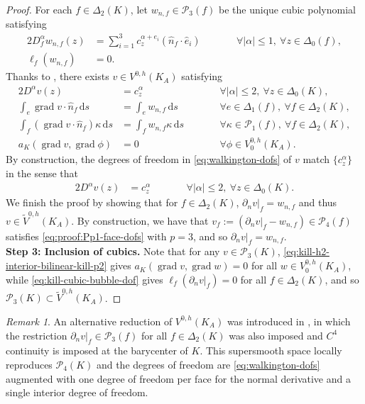 \documentclass{mcom-l}
\theoremstyle{definition}
\theoremstyle{remark}
\newtheorem{remark}[theorem]{Remark}
\numberwithin{equation}{section}
\newcommand{\unitvec}[1]{\hat{#1}}
\renewcommand{\d}[1]{\,\mathrm{d}{#1}}
\DeclareMathOperator{\grad}{grad}
\begin{document}
\begin{proof}
	For each $f \in \Delta_2(K)$, let $w_{n, f} \in \mathcal{P}_3(f)$ be
	the unique cubic polynomial satisfying
	\begin{alignat*}{2}
		D_f^{\alpha} w_{n, f}(z) &= \sum_{i=1}^{3} c_{z}^{\alpha + e_i} 
		(\unitvec{n}_f \cdot \unitvec{e}_i)
		\qquad & &\forall |\alpha| \leq 1, 
		\ \forall z \in \Delta_0(f), \\
		\ell_{f} (w_{n, f}) &= 0. \qquad & & 
	\end{alignat*}
	Thanks to \cite[Lemma 4.8]{FuGuzmanNeilan20}, there exists 
	$v \in V^{0, h}(K_A)$ satisfying
	\begin{alignat*}{2}
		D^{\alpha} v(z) &= c_{z}^{\alpha} 
		\qquad & &\forall |\alpha| \leq 2, \ \forall z \in \Delta_0(K), \\
		\int_{e} \grad v \cdot \unitvec{n}_f \d{s} &= \int_{e} w_{n, f} \d{s}
		\qquad & &\forall e \in \Delta_1(f), \ \forall f \in \Delta_2(K), \\
		\int_f (\grad v \cdot \unitvec{n}_f) \kappa \d{s} 
		&= \int_f w_{n, f} \kappa \d{s} 
		\qquad & &\forall \kappa \in \mathcal{P}_1(f), 
		\ \forall f \in \Delta_2(K), \\
		a_K(\grad v, \grad \phi) &= 0
		\qquad & &\forall \phi \in V^{0, h}_0(K_A).  		
	\end{alignat*}
	By construction, the degrees of freedom in \cref{eq:walkington-dofs} of 
	$v$ match $\{ c_{z}^{\alpha}\}$ in the sense that
	\begin{alignat*}{2}
		D^{\alpha} v(z) &= c_{z}^{\alpha} 
		\qquad & &\forall |\alpha| \leq 2, \ \forall z \in \Delta_0(K).
	\end{alignat*}
	We finish the proof by showing that for $f \in \Delta_2(K)$,
	$\partial_{n}  v|_{f} = w_{n, f}$ and thus $v \in \tilde{V}^{0, h}(K_A)$. 
	By construction, we have that 
	$v_f := (\partial_n v|_f - w_{n, f}) \in \mathcal{P}_{4}(f)$
	satisfies \cref{eq:proof:Pp1-face-dofs} with $p=3$, and so 
	$\partial_n v|_{f}  = w_{n, f}$.	\\
	
	\noindent \textbf{Step 3: Inclusion of cubics. }
	Note that for any $v \in \mathcal{P}_3(K)$, 
	\cref{eq:kill-h2-interior-bilinear-kill-p2} gives 
	$a_K(\grad v, \grad w) = 0$ for all $w \in V^{0, h}_0(K_A)$,
	while \cref{eq:kill-cubic-bubble-dof} gives $\ell_f(\partial_n v|_{f}) = 0$
	for all $f \in \Delta_2(K)$,
	and so $\mathcal{P}_3(K) \subset \tilde{V}^{0, h}(K_A)$.
\end{proof}

\begin{remark}
	An alternative reduction of $V^{0, h}(K_A)$ was introduced in 
	\cite{Walkington14}, in which
	the restriction $\partial_n v|_f \in \mathcal{P}_3(f)$ 
	for all $f \in \Delta_2(K)$ was also imposed and
	$C^4$ continuity is imposed at the barycenter of $K$. This supersmooth space
	locally reproduces $\mathcal{P}_{4}(K)$ and the degrees of freedom 
	are \cref{eq:walkington-dofs} augmented with one degree of freedom per face 
	for the normal derivative and a single interior degree of freedom.
\end{remark}
\end{document}
